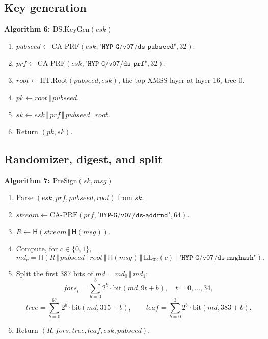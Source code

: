 \documentclass[11pt,a4paper]{article}
\theoremstyle{plain}
\theoremstyle{definition}
\theoremstyle{remark}
\newcommand{\concat}{\,\Vert\,}
\newcommand{\Hash}{\mathsf{H}}
\newenvironment{steps}[1]
  {\par\medskip\noindent\textbf{#1}\par\nopagebreak\small
   \begin{enumerate}[label=\arabic*:,leftmargin=*]}
  {\end{enumerate}\par\medskip}
\begin{document}
\subsection{Key generation}

\begin{steps}{Algorithm 6: $\mathrm{DS.KeyGen}(\mathit{esk})$}
\item $\mathit{pubseed}\gets\mathrm{CA\text{-}PRF}(\mathit{esk},
  \texttt{"HYP-G/v07/ds-pubseed"},32)$.
\item $\mathit{prf}\gets\mathrm{CA\text{-}PRF}(\mathit{esk},
  \texttt{"HYP-G/v07/ds-prf"},32)$.
\item $\mathit{root}\gets\mathrm{HT.Root}(\mathit{pubseed},
  \mathit{esk})$, the top XMSS layer at layer 16, tree 0.
\item $pk\gets\mathit{root}\concat\mathit{pubseed}$.
\item $sk\gets\mathit{esk}\concat\mathit{prf}\concat
  \mathit{pubseed}\concat\mathit{root}$.
\item Return $(pk,sk)$.
\end{steps}

\subsection{Randomizer, digest, and split}

\begin{steps}{Algorithm 7: $\mathrm{PreSign}(sk,\mathit{msg})$}
\item Parse $(\mathit{esk},\mathit{prf},\mathit{pubseed},
  \mathit{root})$ from $sk$.
\item $\mathit{stream}\gets\mathrm{CA\text{-}PRF}(\mathit{prf},
  \texttt{"HYP-G/v07/ds-addrnd"},64)$.
\item $R\gets\Hash(\mathit{stream}\concat\Hash(\mathit{msg}))$.
\item Compute, for $c\in\{0,1\}$,
  \[
   md_c=\Hash(R\concat\mathit{pubseed}\concat\mathit{root}
   \concat\Hash(\mathit{msg})\concat\mathrm{LE}_{32}(c)
   \concat\texttt{"HYP-G/v07/ds-msghash"}).
  \]
\item Split the first 387 bits of $md=md_0\concat md_1$:
  \[
   \mathit{fors}_t=\sum_{b=0}^{8}2^b\cdot
   \mathrm{bit}(md,9t+b),\quad t=0,\ldots,34,
  \]
  \[
   \mathit{tree}=\sum_{b=0}^{67}2^b\cdot
   \mathrm{bit}(md,315+b),\qquad
   \mathit{leaf}=\sum_{b=0}^{3}2^b\cdot
   \mathrm{bit}(md,383+b).
  \]
\item Return $(R,\mathit{fors},\mathit{tree},\mathit{leaf},
  \mathit{esk},\mathit{pubseed})$.
\end{steps}
\end{document}
